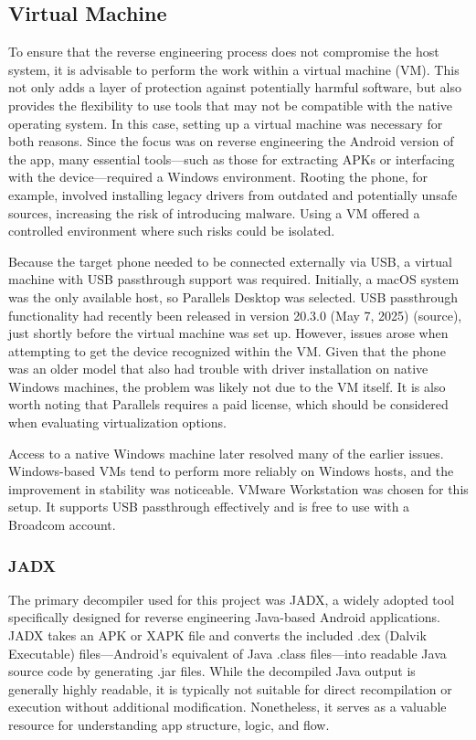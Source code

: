 \subsection{Virtual Machine}
To ensure that the reverse engineering process does not compromise the host system, it is advisable to perform the work within a virtual machine (VM). This not only adds a layer of protection against potentially harmful software, but also provides the flexibility to use tools that may not be compatible with the native operating system. In this case, setting up a virtual machine was necessary for both reasons.
Since the focus was on reverse engineering the Android version of the app, many essential tools—such as those for extracting APKs or interfacing with the device—required a Windows environment. Rooting the phone, for example, involved installing legacy drivers from outdated and potentially unsafe sources, increasing the risk of introducing malware. Using a VM offered a controlled environment where such risks could be isolated.

Because the target phone needed to be connected externally via USB, a virtual machine with USB passthrough support was required. Initially, a macOS system was the only available host, so Parallels Desktop was selected. USB passthrough functionality had recently been released in version 20.3.0 (May 7, 2025) (source), just shortly before the virtual machine was set up. However, issues arose when attempting to get the device recognized within the VM. Given that the phone was an older model that also had trouble with driver installation on native Windows machines, the problem was likely not due to the VM itself. It is also worth noting that Parallels requires a paid license, which should be considered when evaluating virtualization options.

Access to a native Windows machine later resolved many of the earlier issues. Windows-based VMs tend to perform more reliably on Windows hosts, and the improvement in stability was noticeable. VMware Workstation was chosen for this setup. It supports USB passthrough effectively and is free to use with a Broadcom account.


\subsubsection{JADX}
The primary decompiler used for this project was JADX, a widely adopted tool specifically designed for reverse engineering Java-based Android applications. JADX takes an APK or XAPK file and converts the included .dex (Dalvik Executable) files—Android’s equivalent of Java .class files—into readable Java source code by generating .jar files. While the decompiled Java output is generally highly readable, it is typically not suitable for direct recompilation or execution without additional modification. Nonetheless, it serves as a valuable resource for understanding app structure, logic, and flow.

